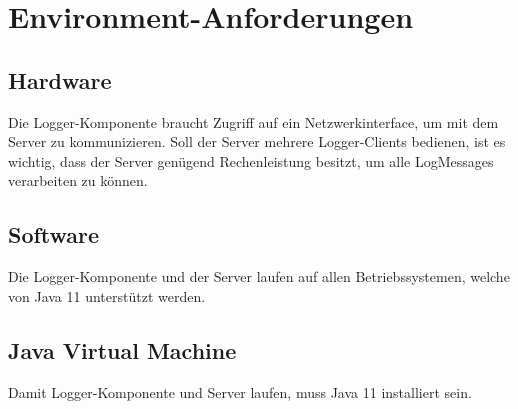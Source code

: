 \section{Environment-Anforderungen}
\subsection{Hardware}
Die Logger-Komponente braucht Zugriff auf ein Netzwerkinterface, um mit dem Server zu kommunizieren. Soll der Server mehrere Logger-Clients bedienen, ist es wichtig, dass der Server genügend Rechenleistung besitzt, um alle LogMessages verarbeiten zu können.

\subsection{Software}
Die Logger-Komponente und der Server laufen auf allen Betriebssystemen, welche von Java 11 unterstützt werden.

\subsection{Java Virtual Machine}
Damit Logger-Komponente und Server laufen, muss Java 11 installiert sein.